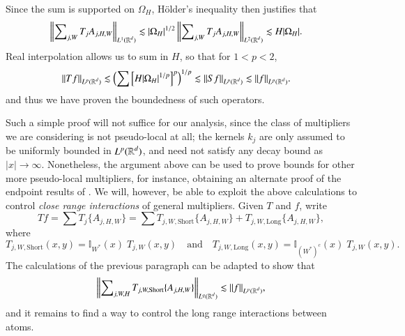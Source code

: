 %
%
%
Since the sum is supported on $\Omega_H$, H\"{o}lder's inequality then justifies that
%
\begin{equation}
\begin{split}
  \left\| \sum\nolimits_{j,W} T_j A_{j,H,W} \right\|_{L^1(\operatorname{\mathbb{R}}^d)} &\lesssim |\Omega_H|^{1/2} \left\| \sum\nolimits_{j,W} T_j A_{j,H,W} \right\|_{L^2(\operatorname{\mathbb{R}}^d)} \lesssim H |\Omega_H|.
\end{split}
\end{equation}
%
Real interpolation allows us to sum in $H$, so that for $1 < p < 2$,
%
\begin{equation}
\begin{split}
  \| Tf \|_{L^p(\operatorname{\mathbb{R}}^d)} &\lesssim \left( \sum \left[ H |\Omega_H|^{1/p} \right]^p \right)^{1/p} \lesssim \| S f \|_{L^p(\operatorname{\mathbb{R}}^d)} \lesssim \| f \|_{L^p(\operatorname{\mathbb{R}}^d)}.
\end{split}
\end{equation}
%
and thus we have proven the boundedness of such operators.

Such a simple proof will not suffice for our analysis, since the class of multipliers we are considering is not pseudo-local at all; the kernels $k_j$ are only assumed to be uniformly bounded in $L^p(\operatorname{\mathbb{R}}^d)$, and need not satisfy any decay bound as $|x| \to \infty$. Nonetheless, the argument above can be used to prove bounds for other more pseudo-local multipliers, for instance, obtaining an alternate proof of the endpoint results of \cite{SeegerSingular}. We will, however, be able to exploit the above calculations to control \emph{close range interactions} of general multipliers. Given $T$ and $f$, write
%
\begin{equation}
  Tf = \sum T_j \{ A_{j,H,W} \} = \sum T_{j,W,\text{Short}} \{ A_{j,H,W} \} + T_{j,W,\text{Long}} \{ A_{j,H,W} \},
\end{equation}
%
where
%
\begin{equation}
  T_{j,W,\text{Short}}(x,y) = \mathbb{I}_{W^*}(x)\; T_{j,W}(x,y) \quad\text{and}\quad T_{j,W,\text{Long}}(x,y) = \mathbb{I}_{(W^*)^c}(x)\; T_{j,W}(x,y).
\end{equation}
%
The calculations of the previous paragraph can be adapted to show that
%
\begin{equation}
  \left\| \sum\nolimits_{j,W,H} T_{j,W,\text{Short}} \{ A_{j,H,W} \} \right\|_{L^q(\operatorname{\mathbb{R}}^d)} \lesssim \| f \|_{L^p(\operatorname{\mathbb{R}}^d)},
\end{equation}
%
and it remains to find a way to control the long range interactions between atoms.

